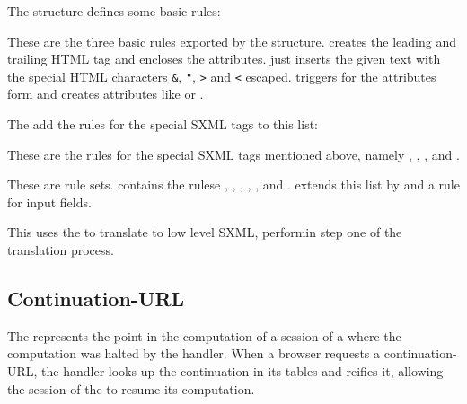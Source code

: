 The  structure defines some basic rules:

\begin{desc}
  These are the three basic rules exported by the 
  structure.   creates the leading and trailing HTML
  tag and encloses the attributes.   just inserts the
  given text with the special HTML characters \verb'&', \verb'"',
  \verb'>' and \verb'<' escaped.   triggers for the
  attributes form and creates attributes like  or
  .
\end{desc}

The  add the rules for the special SXML
tags to this list:

\begin{desc}
  These are the rules for the special SXML tags mentioned above,
  namely , , ,  and
  . 
\end{desc}

\begin{desc}
  These are rule sets.   contains the rulese
  , , ,
  , ,  and
  .   extends this list by
   and a rule for input fields.
\end{desc}

\begin{desc}
  This uses the  to translate  to low
  level SXML, performin step one of the translation process.
\end{desc}


\subsection{Continuation-URL}
\label{sec:continuation-url}

The  represents the point in the computation
of a session of a \surflet where the computation was halted by the
\surflet handler.  When a browser requests a continuation-URL, the
\surflet handler looks up the continuation in its tables and reifies
it, allowing the session of the \surflet to resume its computation.

